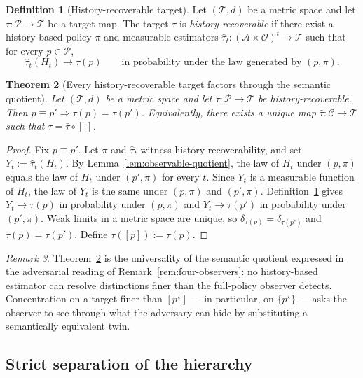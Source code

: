 \documentclass[11pt]{article}
\newtheorem{theorem}{Theorem}[section]
\theoremstyle{definition}
\newtheorem{definition}[theorem]{Definition}
\theoremstyle{remark}
\newtheorem{remark}[theorem]{Remark}
\newcommand{\Acal}{\mathcal{A}}
\newcommand{\Ccal}{\mathcal{C}}
\newcommand{\Ocal}{\mathcal{O}}
\newcommand{\Pcal}{\mathcal{P}}
\begin{document}
\begin{definition}[History-recoverable target]
\label{def:history-recoverable}
Let $(\mathcal{T},d)$ be a metric space and let $\tau:\Pcal\to\mathcal{T}$ be a target map. The target $\tau$ is \emph{history-recoverable} if there exist a history-based policy $\pi$ and measurable estimators $\hat\tau_t:(\Acal\times\Ocal)^t\to\mathcal{T}$ such that for every $p\in\Pcal$,
\[
\hat\tau_t(H_t)\longrightarrow \tau(p)
\qquad
\text{in probability under the law generated by } (p,\pi).
\]
\end{definition}

\begin{theorem}[Every history-recoverable target factors through the semantic quotient]
\label{thm:factor-through-quotient}
Let $(\mathcal{T},d)$ be a metric space and let $\tau:\Pcal\to\mathcal{T}$ be history-recoverable. Then $p\equiv p'\Rightarrow\tau(p)=\tau(p')$. Equivalently, there exists a unique map $\bar\tau:\Ccal\to\mathcal{T}$ such that $\tau=\bar\tau\circ[\cdot]$.
\end{theorem}

\begin{proof}
Fix $p\equiv p'$. Let $\pi$ and $\hat\tau_t$ witness history-recoverability, and set $Y_t:=\hat\tau_t(H_t)$. By Lemma~\ref{lem:observable-quotient}, the law of $H_t$ under $(p,\pi)$ equals the law of $H_t$ under $(p',\pi)$ for every $t$. Since $Y_t$ is a measurable function of $H_t$, the law of $Y_t$ is the same under $(p,\pi)$ and $(p',\pi)$. Definition~\ref{def:history-recoverable} gives $Y_t\to\tau(p)$ in probability under $(p,\pi)$ and $Y_t\to\tau(p')$ in probability under $(p',\pi)$. Weak limits in a metric space are unique, so $\delta_{\tau(p)}=\delta_{\tau(p')}$ and $\tau(p)=\tau(p')$. Define $\bar\tau([p]):=\tau(p)$.
\end{proof}

\begin{remark}
Theorem~\ref{thm:factor-through-quotient} is the universality of the semantic quotient expressed in the adversarial reading of Remark~\ref{rem:four-observers}: no history-based estimator can resolve distinctions finer than the full-policy observer detects. Concentration on a target finer than $[p^\star]$ --- in particular, on $\{p^\star\}$ --- asks the observer to see through what the adversary can hide by substituting a semantically equivalent twin.
\end{remark}

\subsection{Strict separation of the hierarchy}
\end{document}
